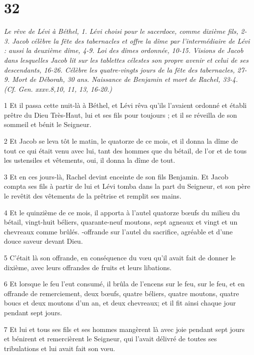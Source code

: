 \chapter{32}

\par \textit{Le rêve de Lévi à Béthel, 1. Lévi choisi pour le sacerdoce, comme dixième fils, 2-3. Jacob célèbre la fête des tabernacles et offre la dîme par l'intermédiaire de Lévi : aussi la deuxième dîme, 4-9. Loi des dîmes ordonnée, 10-15. Visions de Jacob dans lesquelles Jacob lit sur les tablettes célestes son propre avenir et celui de ses descendants, 16-26. Célèbre les quatre-vingts jours de la fête des tabernacles, 27-9. Mort de Déborah, 30 ans. Naissance de Benjamin et mort de Rachel, 33-4. (Cf. Gen. xxxv.8,10, 11, 13, 16-20.)}

\par 1 Et il passa cette nuit-là à Béthel, et Lévi rêva qu'ils l'avaient ordonné et établi prêtre du Dieu Très-Haut, lui et ses fils pour toujours ; et il se réveilla de son sommeil et bénit le Seigneur.
\par 2 Et Jacob se leva tôt le matin, le quatorze de ce mois, et il donna la dîme de tout ce qui était venu avec lui, tant des hommes que du bétail, de l'or et de tous les ustensiles et vêtements, oui, il donna la dîme de tout.
\par 3 Et en ces jours-là, Rachel devint enceinte de son fils Benjamin. Et Jacob compta ses fils à partir de lui et Lévi tomba dans la part du Seigneur, et son père le revêtit des vêtements de la prêtrise et remplit ses mains.
\par 4 Et le quinzième de ce mois, il apporta à l'autel quatorze bœufs du milieu du bétail, vingt-huit béliers, quarante-neuf moutons, sept agneaux et vingt et un chevreaux comme brûlés. -offrande sur l'autel du sacrifice, agréable et d'une douce saveur devant Dieu.
\par 5 C'était là son offrande, en conséquence du vœu qu'il avait fait de donner le dixième, avec leurs offrandes de fruits et leurs libations.
\par 6 Et lorsque le feu l'eut consumé, il brûla de l'encens sur le feu, sur le feu, et en offrande de remerciement, deux bœufs, quatre béliers, quatre moutons, quatre boucs et deux moutons d'un an, et deux chevreaux; et il fit ainsi chaque jour pendant sept jours.
\par 7 Et lui et tous ses fils et ses hommes mangèrent là avec joie pendant sept jours et bénirent et remercièrent le Seigneur, qui l'avait délivré de toutes ses tribulations et lui avait fait son vœu.
